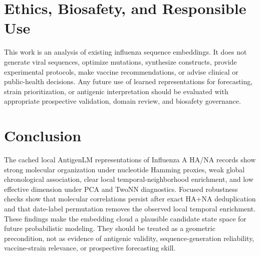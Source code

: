 \documentclass[11pt]{article}
\begin{document}
\section{Ethics, Biosafety, and Responsible Use}

This work is an analysis of existing influenza sequence embeddings. It does not generate viral sequences, optimize mutations, synthesize constructs, provide experimental protocols, make vaccine recommendations, or advise clinical or public-health decisions. Any future use of learned representations for forecasting, strain prioritization, or antigenic interpretation should be evaluated with appropriate prospective validation, domain review, and biosafety governance.

\section{Conclusion}

The cached local AntigenLM representations of Influenza A HA/NA records show strong molecular organization under nucleotide Hamming proxies, weak global chronological association, clear local temporal-neighborhood enrichment, and low effective dimension under PCA and TwoNN diagnostics. Focused robustness checks show that molecular correlations persist after exact HA+NA deduplication and that date-label permutation removes the observed local temporal enrichment. These findings make the embedding cloud a plausible candidate state space for future probabilistic modeling. They should be treated as a geometric precondition, not as evidence of antigenic validity, sequence-generation reliability, vaccine-strain relevance, or prospective forecasting skill.



\end{document}
